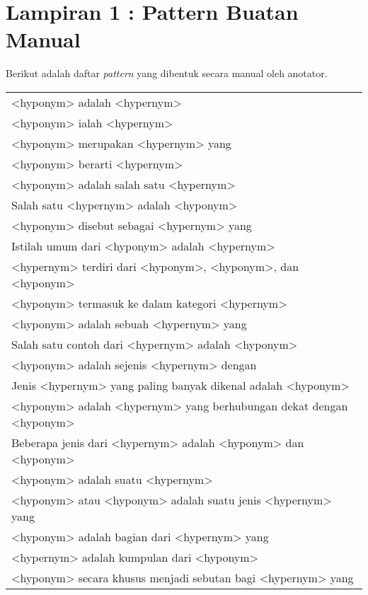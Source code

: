 \chapter*{Lampiran 1 : Pattern Buatan Manual}
Berikut adalah daftar \textit{pattern} yang dibentuk secara manual oleh anotator.
\begin{table}
  \centering
  \label{table:patternmanual}
  \begin{tabular}{|m{32em}|}
    \hline
      <hyponym> adalah <hypernym> \\  
      <hyponym> ialah <hypernym> \\ 
      <hyponym> merupakan <hypernym> yang \\ 
      <hyponym> berarti <hypernym> \\ 
      <hyponym> adalah salah satu <hypernym> \\ 
      Salah satu <hypernym> adalah <hyponym> \\ 
      <hyponym> disebut sebagai <hypernym> yang \\ 
      Istilah umum dari <hyponym> adalah <hypernym> \\ 
      <hypernym> terdiri dari <hyponym>, <hyponym>, dan <hyponym> \\ 
      <hyponym> termasuk ke dalam kategori <hypernym> \\ 
      <hyponym> adalah sebuah <hypernym> yang \\ 
      Salah satu contoh dari <hypernym> adalah <hyponym> \\ 
      <hyponym> adalah sejenis <hypernym> dengan \\ 
      Jenis <hypernym> yang paling banyak dikenal adalah <hyponym> \\ 
      <hyponym> adalah <hypernym> yang berhubungan dekat dengan <hyponym> \\ 
      Beberapa jenis dari <hypernym> adalah <hyponym> dan <hyponym> \\ 
      <hyponym> adalah suatu <hypernym> \\ 
      <hyponym> atau <hyponym> adalah suatu jenis <hypernym> yang \\ 
      <hyponym> adalah bagian dari <hypernym> yang \\ 
      <hypernym> adalah kumpulan dari <hyponym> \\ 
      <hyponym> secara khusus menjadi sebutan bagi <hypernym> yang \\ 

\end{tabular}
\end{table}
